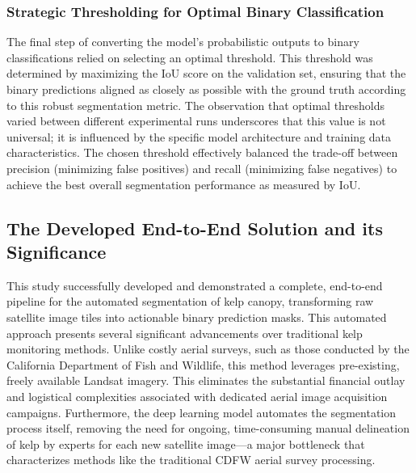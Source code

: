 \documentclass{article}
\begin{document}
\subsubsection{Strategic Thresholding for Optimal Binary Classification}

The final step of converting the model's probabilistic outputs to binary classifications relied on selecting an optimal threshold. This threshold was determined by maximizing the IoU score on the validation set, ensuring that the binary predictions aligned as closely as possible with the ground truth according to this robust segmentation metric. The observation that optimal thresholds varied between different experimental runs underscores that this value is not universal; it is influenced by the specific model architecture and training data characteristics. The chosen threshold effectively balanced the trade-off between precision (minimizing false positives) and recall (minimizing false negatives) to achieve the best overall segmentation performance as measured by IoU.

\subsection{The Developed End-to-End Solution and its Significance}

This study successfully developed and demonstrated a complete, end-to-end pipeline for the automated segmentation of kelp canopy, transforming raw satellite image tiles into actionable binary prediction masks. This automated approach presents several significant advancements over traditional kelp monitoring methods. Unlike costly aerial surveys, such as those conducted by the California Department of Fish and Wildlife, this method leverages pre-existing, freely available Landsat imagery. This eliminates the substantial financial outlay and logistical complexities associated with dedicated aerial image acquisition campaigns. Furthermore, the deep learning model automates the segmentation process itself, removing the need for ongoing, time-consuming manual delineation of kelp by experts for each new satellite image—a major bottleneck that characterizes methods like the traditional CDFW aerial survey processing. 
\end{document}
